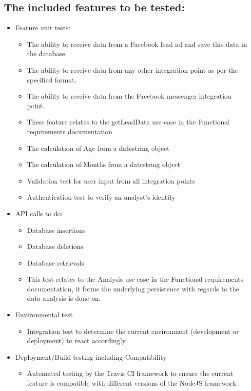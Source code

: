 \documentclass{article}
\begin{document}
\subsection{The included features to be tested:}
\begin{itemize}
\item Feature unit tests:
	\begin{itemize}
	\item The ability to receive data from a Facebook lead ad and save this data in the database.
	\item The ability to receive data from any other integration point as per the specified format.
	\item The ability to receive data from the Facebook messenger integration point.
	\item These feature relates to the getLeadData use case in the Functional requirements documentation
	\item The calculation of Age from a datestring object
	\item The calculation of Months from a datestring object
	\item Validation test for user input from all integration points
	\item Authentication test to verify an analyst's identity
	\end{itemize}
	
\item API calls to do:
	\begin{itemize}
	\item Database insertions 
	\item Database deletions 
	\item Database retrievals 
	\item This test relates to the Analysis use case in the Functional requirements documentation, it forms the underlying persistence with regards to the data analysis is done on.
	\end{itemize}
\item Environmental test
	\begin{itemize}
	\item Integration test to determine the current environment (development or deployment) to react accordingly 
	\end{itemize}
\item Deployment/Build testing including Compatibility
		\begin{itemize}
	\item Automated testing by the Travis CI framework to ensure the current feature is compatible with different versions of the NodeJS framework. 
	\end{itemize}
\end{itemize}
\end{document}
